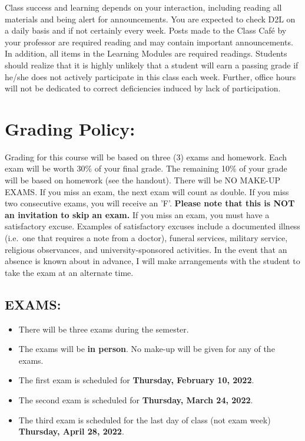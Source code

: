 \documentclass[11pt,]{article}
\providecommand{\tightlist}{%
  \setlength{\itemsep}{0pt}\setlength{\parskip}{0pt}}
\begin{document}
Class success and learning depends on your interaction,
including reading all materials and being alert for announcements. You are expected to check D2L
on a daily basis and if not certainly every week. Posts made to the Class Café by your professor are
required reading and may contain important announcements. In addition, all items in the Learning
Modules are required readings. Students should realize that it is highly unlikely that a student will
earn a passing grade if he/she does not actively participate in this class each week. Further, office
hours will not be dedicated to correct deficiencies induced by lack of participation.

\hypertarget{grading-policy}{%
\section{Grading Policy:}\label{grading-policy}}

Grading for this course will be based on three (3) exams and homework. Each exam will be worth 30\% of your final grade. The remaining 10\% of your grade will be based on homework (see the handout). There will be NO
MAKE-UP EXAMS. If you miss an exam, the next exam will count as double. If you miss two consecutive exams,
you will receive an 'F'. \textbf{Please note that this is NOT an invitation to skip an exam.} If you miss an exam,
you must have a satisfactory excuse. Examples of satisfactory excuses include a documented illness (i.e.~one that
requires a note from a doctor), funeral services, military service, religious observances, and university-sponsored
activities. In the event that an absence is known about in advance, I will make arrangements with the student to
take the exam at an alternate time.

\hypertarget{exams}{%
\subsection{EXAMS:}\label{exams}}

\begin{itemize}
\tightlist
\item
  There will be three exams during the semester.
\item
  The exams will be \textbf{in person}. No make-up will be given for any of
  the exams.
\item
  The first exam is scheduled for \textbf{Thursday, February 10, 2022}.
\item
  The second exam is scheduled for \textbf{Thursday, March 24, 2022}.
\item
  The third exam is scheduled for the last day of class (not exam week) \textbf{Thursday, April 28, 2022}.
\end{itemize}
\end{document}
